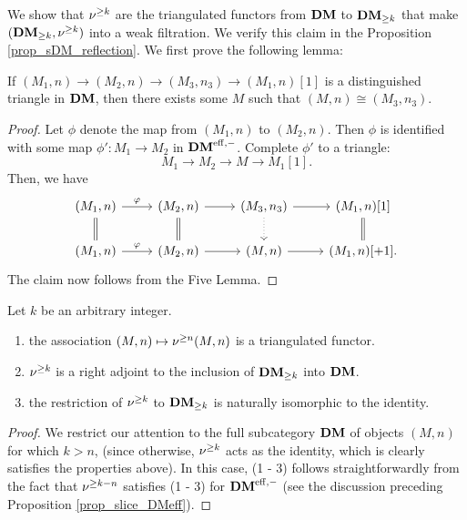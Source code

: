 We show that $\sgDM{k}$ are the triangulated functors from $\DM$
to $\GFiltDM[k]{\DM}$ that make $(\GFiltDM[k]{\DM}, \sgDM{k})$ 
into a weak filtration. We verify this claim in the Proposition 
\ref{prop_sDM_reflection}. We first prove the following lemma:

\begin{lem}\label{lem_triangle_in_DM}
If $(M_1, n) \to (M_2, n) \to (M_3, n_3) \to (M_1, n)[1]$
is a distinguished triangle in $\DM$, then there exists some $M$ 
such that $(M, n) \cong (M_3, n_3)$.
\end{lem}
\begin{proof}
Let $\phi$ denote the map from $(M_1, n)$ to $(M_2, n)$. Then
$\phi$ is identified with some map $\phi': M_1 \to M_2$ in 
$\DMeff$. Complete $\phi'$ to a triangle:
\[
M_1 \to M_2 \to M \to M_1[1].
\]
Then, we have
\[
\begin{tikzcd}
(M_1, n) \arrow{r}{\phi} \arrow[equals]{d} &
(M_2, n) \arrow{r} \arrow[equals]{d} &
(M_3, n_3) \arrow{r} \arrow[dotted]{d} &
(M_1, n)[1] \arrow[equals]{d}\\
(M_1, n) \arrow{r}{\phi} &
(M_2, n) \arrow{r} &
(M, n) \arrow{r} &
(M_1, n)[+1].
\end{tikzcd}
\]
The claim now follows from the Five Lemma.
\end{proof}

\begin{prop}\label{prop_sDM_reflection}
Let $k$ be an arbitrary integer.

\begin{enumerate}
\item the association $(M, n) \mapsto \sgDM{n} (M, n)$ is 
a triangulated functor.

\item $\sgDM{k}$ is a right adjoint to the inclusion of 
$\GFiltDM[k]{\DM}$ into $\DM$.

\item the restriction of $\sgDM{k}$ to $\GFiltDM[k]{\DM}$ is 
naturally isomorphic to the identity.
\end{enumerate}
\end{prop}
\begin{proof}
We restrict our attention to the full subcategory $\DM$ of objects 
$(M, n)$ for which $k > n$, (since otherwise, $\sgDM{k}$ acts as 
the identity, which is clearly satisfies the properties above). In 
this case, (1 - 3) follows straightforwardly from the fact that
$\sgDM{k - n}$ satisfies (1 - 3) for $\DMeff$ (see the discussion
preceding Proposition \ref{prop_slice_DMeff}).
\end{proof}

